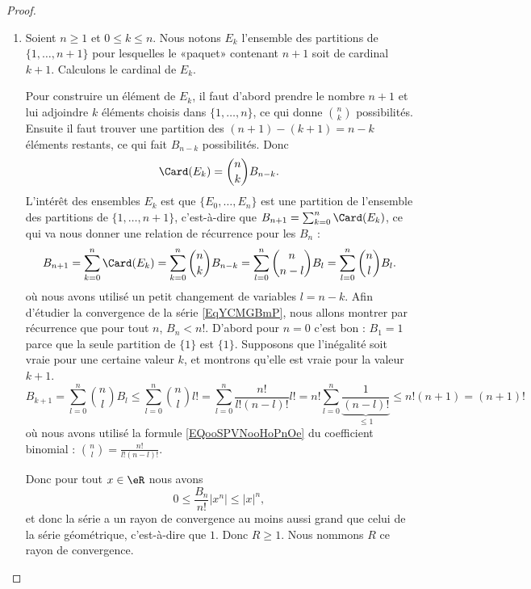 \begin{proof}
	\begin{enumerate}
		\item
		      Soient \( n\geq 1\) et \( 0\leq k\leq n\). Nous notons \( E_k\) l'ensemble des partitions de \( \{ 1,\ldots, n+1 \}\) pour lesquelles le «paquet» contenant \( n+1\) soit de cardinal \( k+1\). Calculons le cardinal de \( E_k\).

		      Pour construire un élément de \( E_k\), il faut d'abord prendre le nombre \( n+1\) et lui adjoindre \( k\) éléments choisis dans \( \{ 1,\ldots, n \}\), ce qui donne \( n\choose k\) possibilités. Ensuite il faut trouver une partition des \( (n+1)-(k+1)=n-k\) éléments restants, ce qui fait \( B_{n-k}\) possibilités. Donc
		      \begin{equation}
			      \Card(E_k)={n\choose k}B_{n-k}.
		      \end{equation}
		      L'intérêt des ensembles \( E_k\) est que \( \{ E_0,\ldots, E_n \}\) est une partition de l'ensemble des partitions de \( \{ 1,\ldots, n+1 \}\), c'est-à-dire que \( B_{n+1}=\sum_{k=0}^n\Card(E_k)\), ce qui va nous donner une relation de récurrence pour les \( B_n\) :
		      \begin{equation}
			      B_{n+1}=\sum_{k=0}^n\Card(E_k)
			      =\sum_{k=0}^n{n\choose k}B_{n-k}
			      =\sum_{l=0}^n{n\choose n-l}B_l
			      =\sum_{l=0}^n{n\choose l}B_l.
		      \end{equation}
		      où nous avons utilisé un petit changement de variables \( l=n-k\). Afin d'étudier la convergence de la série \eqref{EqYCMGBmP}, nous allons montrer par récurrence que pour tout \( n\), \( B_n<n!\). D'abord pour \( n=0\) c'est bon : \( B_1=1\) parce que la seule partition de \( \{ 1 \}\) est \( \{ 1 \}\). Supposons que l'inégalité soit vraie pour une certaine valeur \( k\), et montrons qu'elle est vraie pour la valeur \( k+1\).
		      \begin{equation}
			      B_{k+1}=\sum_{l=0}^n{n\choose l}B_l
			      \leq \sum_{l=0}^n{n\choose l}l!
			      =\sum_{l=0}^n \frac{ n! }{ l!(n-l)! }l!=n!\sum_{l=0}^n\underbrace{\frac{ 1 }{ (n-l)! }}_{\leq 1}
			      \leq n!(n+1)
			      =(n+1)!
		      \end{equation}
		      où nous avons utilisé la formule \eqref{EQooSPVNooHoPnOe} du coefficient binomial : \( {n\choose l}=\frac{ n! }{ l!(n-l)! }\).

		      Donc pour tout \( x\in \eR\) nous avons
		      \begin{equation}
			      0\leq \frac{ B_n }{ n! }| x^n |\leq | x |^n,
		      \end{equation}
		      et donc la série a un rayon de convergence au moins aussi grand que celui de la série géométrique, c'est-à-dire que \( 1\). Donc \( R\geq 1\). Nous nommons \( R\) ce rayon de convergence.


\end{enumerate}
\end{proof}
